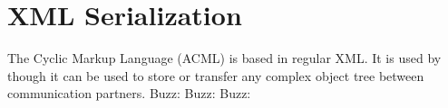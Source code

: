 \ClearAPI
\section{XML Serialization}
\label{feature:ACML}
\ClearAPI
The \AMBETH{} Cyclic Markup Language (ACML) is based in regular XML. It is used by  though it can be used to store or transfer any complex object tree between communication partners.
Buzz: 
Buzz: 
Buzz: 
\TODO